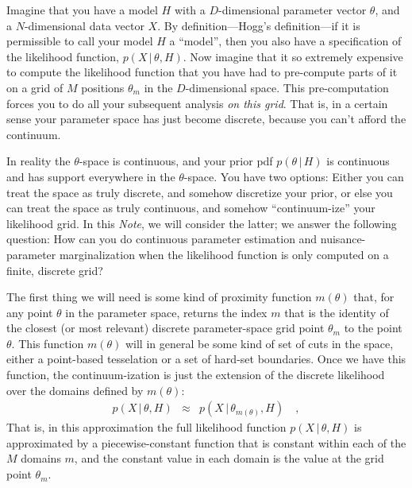 \documentclass[12pt]{article}
\newcommand{\documentname}{\textsl{Note}}
\newcommand{\given}{\,|\,}
\begin{document}
Imagine that you have a model $H$ with a $D$-dimensional parameter vector $\theta$,
and a $N$-dimensional data vector $X$.
By definition---Hogg's definition---if it is permissible to call your model $H$
a ``model'', then you also have a specification of the likelihood function,
$p(X\given\theta, H)$.
Now imagine that it so extremely expensive to compute the likelihood function that
you have had to pre-compute parts of it on a grid of $M$ positions $\theta_m$ in
the $D$-dimensional space.
This pre-computation forces you to do all your subsequent analysis
\emph{on this grid}.
That is, in a certain sense your parameter space has just become discrete,
because you can't afford the continuum.

In reality the $\theta$-space is continuous, and your prior pdf $p(\theta\given H)$
is continuous and has support everywhere in the $\theta$-space.
You have two options:
Either you can treat the space as truly discrete, and somehow discretize your prior,
or else you can treat the space as truly continuous, and somehow ``continuum-ize'' your likelihood grid.
In this \documentname, we will consider the latter; we answer the following question:
How can you do continuous parameter estimation and nuisance-parameter marginalization
when the likelihood function is only computed on a finite, discrete grid?

The first thing we will need is some kind of proximity function
$m(\theta)$ that, for any point $\theta$ in the parameter space,
returns the index $m$ that is the identity of the closest (or most
relevant) discrete parameter-space grid point $\theta_m$ to the point
$\theta$.  This function $m(\theta)$ will in general be some kind of
set of cuts in the space, either a point-based tesselation or a set of
hard-set boundaries.  Once we have this function, the
continuum-ization is just the extension of the discrete likelihood
over the domains defined by $m(\theta)$:
\begin{eqnarray}
p(X\given\theta, H)
 &\approx&
p(X\given\theta_{m(\theta)}, H)
\quad ,
\end{eqnarray}
That is, in this approximation the full likelihood function
$p(X\given\theta, H)$ is approximated by a piecewise-constant function
that is constant within each of the $M$ domains $m$, and the constant
value in each domain is the value at the grid point $\theta_m$.
\end{document}
